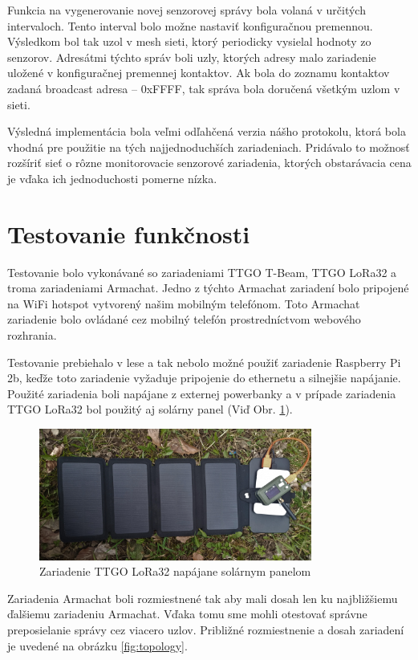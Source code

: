 \documentclass[slovak,master]{diploma}
\begin{document}
Funkcia na vygenerovanie novej senzorovej správy bola volaná v určitých intervaloch. Tento interval bolo možne nastaviť konfiguračnou premennou. Výsledkom bol tak 
uzol v mesh sieti, ktorý periodicky vysielal hodnoty zo senzorov. Adresátmi týchto správ boli uzly, ktorých adresy malo zariadenie uložené v konfiguračnej premennej kontaktov. 
Ak bola do zoznamu kontaktov zadaná broadcast adresa -- 0xFFFF, tak správa bola doručená všetkým uzlom v sieti.

Výsledná implementácia bola veľmi odľahčená verzia nášho protokolu, ktorá bola vhodná pre použitie na tých najjednoduchších zariadeniach. Pridávalo to možnosť rozšíriť sieť 
o rôzne monitorovacie senzorové zariadenia, ktorých obstarávacia cena je vďaka ich jednoduchosti pomerne nízka.


\section{Testovanie funkčnosti}
Testovanie bolo vykonávané so zariadeniami TTGO T-Beam, TTGO LoRa32 a troma zariadeniami Armachat. Jedno z týchto Armachat zariadení 
bolo pripojené na WiFi hotspot vytvorený našim mobilným telefónom. Toto Armachat zariadenie bolo ovládané cez mobilný telefón prostredníctvom webového rozhrania. 

Testovanie prebiehalo v lese a tak nebolo možné použiť zariadenie Raspberry Pi 2b, keďže toto zariadenie vyžaduje pripojenie do ethernetu a silnejšie napájanie. 
Použité zariadenia boli napájane z externej powerbanky a v prípade zariadenia TTGO LoRa32 bol použitý aj solárny panel (Viď Obr. \ref{fig:ttgoSolar}).

\begin{figure}[h!]
  \centering
  \includegraphics[width=0.8\textwidth]{Figures/ttgoLora32solar.jpg}
  \caption{Zariadenie TTGO LoRa32 napájane solárnym panelom}
  \label{fig:ttgoSolar}
\end{figure}


Zariadenia Armachat boli rozmiestnené tak aby mali dosah len ku najbližšiemu ďalšiemu zariadeniu Armachat. Vďaka tomu sme mohli otestovať správne 
preposielanie správy cez viacero uzlov. Približné rozmiestnenie a dosah zariadení je uvedené na obrázku \ref{fig:topology}.
\end{document}
